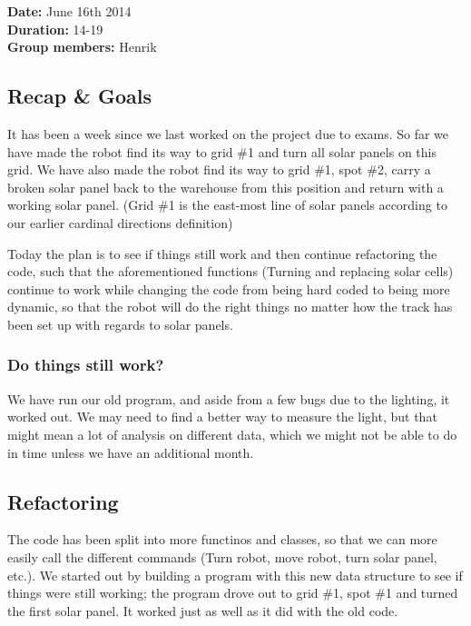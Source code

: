 \textbf{Date:} June 16th 2014\\\textbf{Duration:} 14-19\\\textbf{Group
members:} Henrik

\subsection{Recap \& Goals}

It has been a week since we last worked on the project due to exams. So
far we have made the robot find its way to grid \#1 and turn all solar
panels on this grid. We have also made the robot find its way to grid
\#1, spot \#2, carry a broken solar panel back to the warehouse from
this position and return with a working solar panel. (Grid \#1 is the
east-most line of solar panels according to our earlier cardinal
directions definition)

Today the plan is to see if things still work and then continue
refactoring the code, such that the aforementioned functions (Turning
and replacing solar cells) continue to work while changing the code from
being hard coded to being more dynamic, so that the robot will do the
right things no matter how the track has been set up with regards to
solar panels.

\subsubsection{Do things still work?}

We have run our old program, and aside from a few bugs due to the
lighting, it worked out. We may need to find a better way to measure the
light, but that might mean a lot of analysis on different data, which we
might not be able to do in time unless we have an additional month.

\subsection{Refactoring}

The code has been split into more functinos and classes, so that we can
more easily call the different commands (Turn robot, move robot, turn
solar panel, etc.). We started out by building a program with this new
data structure to see if things were still working; the program drove
out to grid \#1, spot \#1 and turned the first solar panel. It worked
just as well as it did with the old code.

